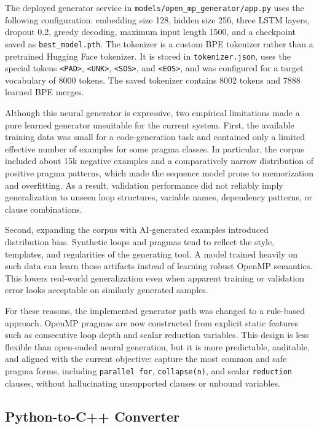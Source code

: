 \documentclass[11pt,a4paper]{article}
\newcommand{\modulepath}[1]{\texttt{#1}}
\begin{document}
The deployed generator service in \modulepath{models/open\_mp\_generator/app.py}
uses the following configuration: embedding size 128, hidden size 256, three
LSTM layers, dropout 0.2, greedy decoding, maximum input length 1500, and a
checkpoint saved as \modulepath{best\_model.pth}. The tokenizer is a custom BPE
tokenizer rather than a pretrained Hugging Face tokenizer. It is stored in
\modulepath{tokenizer.json}, uses the special tokens \texttt{<PAD>},
\texttt{<UNK>}, \texttt{<SOS>}, and \texttt{<EOS>}, and was configured for a
target vocabulary of 8000 tokens. The saved tokenizer contains 8002 tokens and
7888 learned BPE merges.

Although this neural generator is expressive, two empirical limitations made a
pure learned generator unsuitable for the current system. First, the available
training data was small for a code-generation task and contained only a limited
effective number of examples for some pragma classes. In particular, the corpus
included about 15k negative examples and a comparatively narrow distribution of
positive pragma patterns, which made the sequence model prone to memorization
and overfitting. As a result, validation performance did not reliably imply
generalization to unseen loop structures, variable names, dependency patterns,
or clause combinations.

Second, expanding the corpus with AI-generated examples introduced distribution
bias. Synthetic loops and pragmas tend to reflect the style, templates, and
regularities of the generating tool. A model trained heavily on such data can
learn those artifacts instead of learning robust OpenMP semantics. This lowers
real-world generalization even when apparent training or validation error looks
acceptable on similarly generated samples.

For these reasons, the implemented generator path was changed to a rule-based
approach. OpenMP pragmas are now constructed from explicit static features such
as consecutive loop depth and scalar reduction variables. This design is less
flexible than open-ended neural generation, but it is more predictable,
auditable, and aligned with the current objective: capture the most common and
safe pragma forms, including \texttt{parallel for}, \texttt{collapse(n)}, and
scalar \texttt{reduction} clauses, without hallucinating unsupported clauses or
unbound variables.

\subsection{Python-to-C++ Converter}
\end{document}
